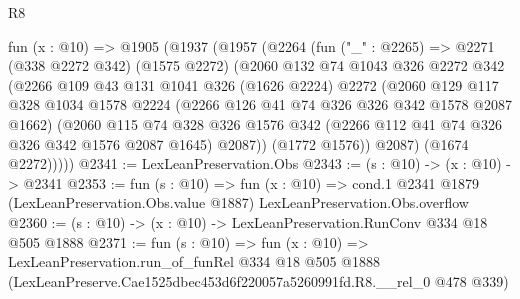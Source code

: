 \begin{lexlean}{R8}
\begin{coremodule}
  fun (x : @10) =>
  @1905
    (@1937
      (@1957
        (@2264
          (fun ("_" : @2265) =>
          @2271
            (@338 @2272 @342)
            (@1575 @2272)
            (@2060
              @132
              @74
              @1043
              @326
              @2272
              @342
              (@2266
                @109
                @43
                @131
                @1041
                @326
                (@1626 @2224)
                @2272
                (@2060
                  @129
                  @117
                  @328
                  @1034
                  @1578
                  @2224
                  (@2266 @126 @41 @74 @326 @326 @342 @1578 @2087 @1662)
                  (@2060
                    @115
                    @74
                    @328
                    @326
                    @1576
                    @342
                    (@2266 @112 @41 @74 @326 @326 @342 @1576 @2087 @1645)
                    @2087))
                (@1772 @1576))
              @2087)
            (@1674 @2272)))))
@2341 := LexLeanPreservation.Obs
@2343 := (s : @10) -> (x : @10) -> @2341
@2353 := fun (s : @10) =>
  fun (x : @10) =>
  cond.{1} @2341 @1879 (LexLeanPreservation.Obs.value @1887) LexLeanPreservation.Obs.overflow
@2360 := (s : @10) -> (x : @10) -> LexLeanPreservation.RunConv @334 @18 @505 @1888
@2371 := fun (s : @10) =>
  fun (x : @10) =>
  LexLeanPreservation.run_of_funRel
    @334
    @18
    @505
    @1888
    (LexLeanPreserve.Cae1525dbec453d6f220057a5260991fd.R8.__rel_0 @478 @339)
\end{coremodule}
\end{lexlean}
